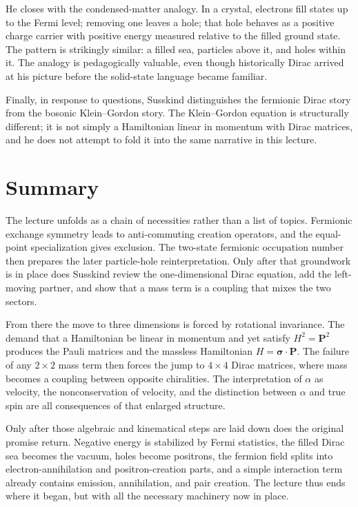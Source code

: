 He closes with the condensed-matter analogy. In a crystal, electrons fill states up to the Fermi level; removing one leaves a hole; that hole behaves as a positive charge carrier with positive energy measured relative to the filled ground state. The pattern is strikingly similar: a filled sea, particles above it, and holes within it. The analogy is pedagogically valuable, even though historically Dirac arrived at his picture before the solid-state language became familiar.

Finally, in response to questions, Susskind distinguishes the fermionic Dirac story from the bosonic Klein--Gordon story. The Klein--Gordon equation is structurally different; it is not simply a Hamiltonian linear in momentum with Dirac matrices, and he does not attempt to fold it into the same narrative in this lecture.

\section{Summary}

The lecture unfolds as a chain of necessities rather than a list of topics. Fermionic exchange symmetry leads to anti-commuting creation operators, and the equal-point specialization gives exclusion. The two-state fermionic occupation number then prepares the later particle-hole reinterpretation. Only after that groundwork is in place does Susskind review the one-dimensional Dirac equation, add the left-moving partner, and show that a mass term is a coupling that mixes the two sectors.

From there the move to three dimensions is forced by rotational invariance. The demand that a Hamiltonian be linear in momentum and yet satisfy \(H^2=\mathbf P^2\) produces the Pauli matrices and the massless Hamiltonian \(H=\boldsymbol{\sigma}\cdot\mathbf P\). The failure of any \(2\times2\) mass term then forces the jump to \(4\times4\) Dirac matrices, where mass becomes a coupling between opposite chiralities. The interpretation of \(\alpha\) as velocity, the nonconservation of velocity, and the distinction between \(\alpha\) and true spin are all consequences of that enlarged structure.

Only after those algebraic and kinematical steps are laid down does the original promise return. Negative energy is stabilized by Fermi statistics, the filled Dirac sea becomes the vacuum, holes become positrons, the fermion field splits into electron-annihilation and positron-creation parts, and a simple interaction term already contains emission, annihilation, and pair creation. The lecture thus ends where it began, but with all the necessary machinery now in place.
